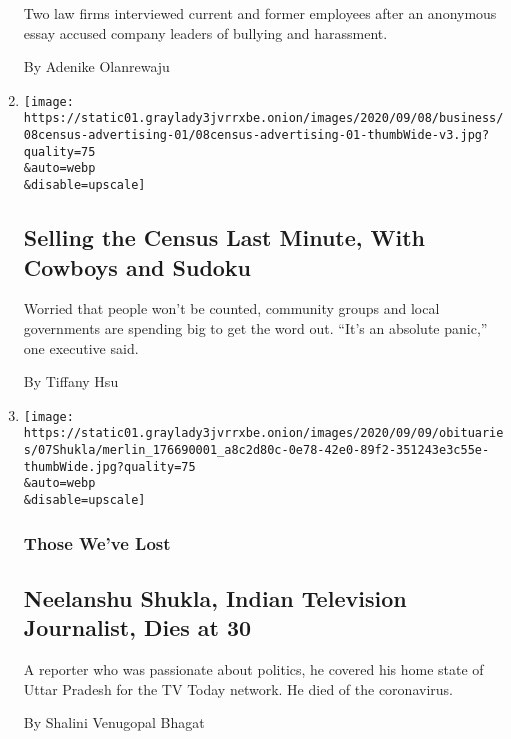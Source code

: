 \begin{enumerate}
  Two law firms interviewed current and former employees after an
  anonymous essay accused company leaders of bullying and harassment.

  By Adenike Olanrewaju
\item
  \href{/2020/09/08/business/media/2020-census-advertising.html}{}

  \texttt{[image: https://static01.graylady3jvrrxbe.onion/images/2020/09/08/business/08census-advertising-01/08census-advertising-01-thumbWide-v3.jpg?quality=75\\\&auto=webp\\\&disable=upscale]}

  \hypertarget{selling-the-census-last-minute-with-cowboys-and-sudoku}{%
  \subsection{Selling the Census Last Minute, With Cowboys and
  Sudoku}\label{selling-the-census-last-minute-with-cowboys-and-sudoku}}

  Worried that people won't be counted, community groups and local
  governments are spending big to get the word out. ``It's an absolute
  panic,'' one executive said.

  By Tiffany Hsu
\item
  \href{/2020/09/08/obituaries/neelanshu-shukla-dead-coronavirus.html}{}

  \texttt{[image: https://static01.graylady3jvrrxbe.onion/images/2020/09/09/obituaries/07Shukla/merlin\_176690001\_a8c2d80c-0e78-42e0-89f2-351243e3c55e-thumbWide.jpg?quality=75\\\&auto=webp\\\&disable=upscale]}

  \hypertarget{those-weve-lost}{%
  \subsubsection{Those We've Lost}\label{those-weve-lost}}

  \hypertarget{neelanshu-shukla-indian-television-journalist-dies-at-30}{%
  \subsection{Neelanshu Shukla, Indian Television Journalist, Dies at
  30}\label{neelanshu-shukla-indian-television-journalist-dies-at-30}}

  A reporter who was passionate about politics, he covered his home
  state of Uttar Pradesh for the TV Today network. He died of the
  coronavirus.

  By Shalini Venugopal Bhagat
\end{enumerate}

